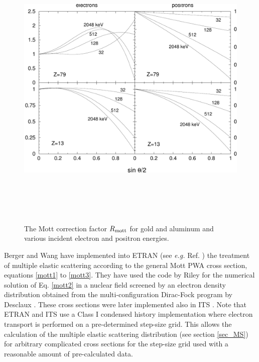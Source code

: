 \begin{figure}[htp]
\includegraphics[height=14cm,width=14cm]{figures/mott1}
\caption[The Mott correction]{\label{fig_mott} The Mott correction factor 
$R_{\rm mott}$ for gold and aluminum and various incident 
electron and positron energies.}
\end{figure} 

Berger and Wang \cite{BW89} have implemented into ETRAN (see {\em e.g.} 
Ref. \cite{Se89}) 
the treatment of multiple 
elastic scattering according to the general Mott PWA cross section, 
equations \eqref{mott1} to \eqref{mott3}. They have used the code 
by Riley \cite{Ri74} for the numerical solution of Eq. \eqref{mott2} 
in a nuclear field screened by an electron density distribution 
obtained from the multi-configuration Dirac-Fock program by 
Desclaux \cite{De75}. These cross sections were later implemented 
also in ITS \cite{ITSV3}. Note that ETRAN and ITS use a Class I 
condensed history implementation where electron transport is 
performed on  a pre-determined step-size grid. This allows 
the calculation of the multiple elastic scattering distribution 
(see section \ref{sec_MS}) for arbitrary complicated cross 
sections for the step-size grid used with a reasonable amount 
of pre-calculated data. 

